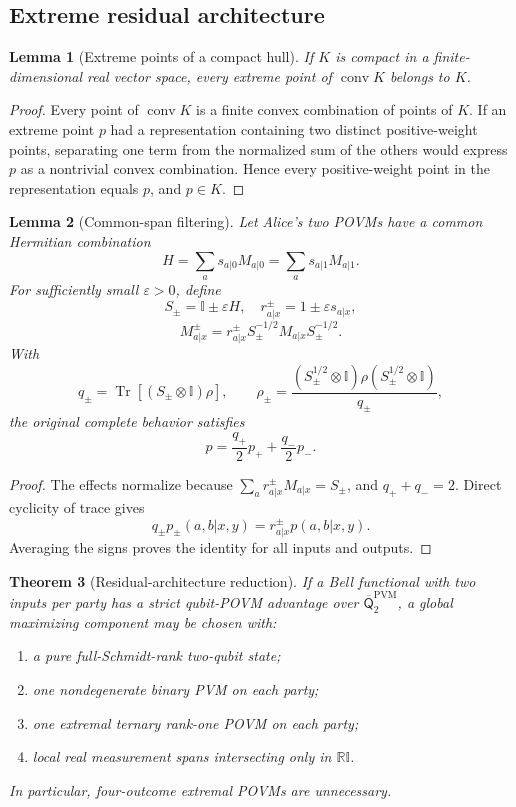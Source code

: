 \documentclass[11pt]{article}
\newtheorem{theorem}{Theorem}[section]
\newtheorem{lemma}[theorem]{Lemma}
\theoremstyle{definition}
\newcommand{\Tr}{\operatorname{Tr}}
\newcommand{\conv}{\operatorname{conv}}
\newcommand{\id}{\mathbb I}
\newcommand{\R}{\mathbb R}
\newcommand{\Qbar}{\overline{\mathsf Q}}
\newcommand{\PVM}{\mathrm{PVM}}
\newcommand{\eps}{\varepsilon}
\begin{document}
\subsection{Extreme residual architecture}

\begin{lemma}[Extreme points of a compact hull]
\label{lem:extreme-hull}
If \(K\) is compact in a finite-dimensional real vector space, every extreme
point of \(\conv K\) belongs to \(K\).
\end{lemma}

\begin{proof}
Every point of \(\conv K\) is a finite convex combination of points of \(K\).
If an extreme point \(p\) had a representation containing two distinct
positive-weight points, separating one term from the normalized sum of the
others would express \(p\) as a nontrivial convex combination. Hence every
positive-weight point in the representation equals \(p\), and \(p\in K\).
\end{proof}

\begin{lemma}[Common-span filtering]
\label{lem:common-span}
Let Alice's two POVMs have a common Hermitian combination
\[
H=\sum_a s_{a|0}M_{a|0}=\sum_a s_{a|1}M_{a|1}.
\]
For sufficiently small \(\eps>0\), define
\[
S_\pm=\id\pm\eps H,\quad
r^\pm_{a|x}=1\pm\eps s_{a|x},
\]
\[
M^\pm_{a|x}
=r^\pm_{a|x}S_\pm^{-1/2}M_{a|x}S_\pm^{-1/2}.
\]
With
\[
q_\pm=\Tr[(S_\pm\otimes\id)\rho],\qquad
\rho_\pm=
\frac{(S_\pm^{1/2}\otimes\id)\rho(S_\pm^{1/2}\otimes\id)}
{q_\pm},
\]
the original complete behavior satisfies
\[
p=\frac{q_+}{2}p_++\frac{q_-}{2}p_-.
\]
\end{lemma}

\begin{proof}
The effects normalize because
\(\sum_a r^\pm_{a|x}M_{a|x}=S_\pm\), and \(q_++q_-=2\).
Direct cyclicity of trace gives
\[
q_\pm p_\pm(a,b|x,y)=r^\pm_{a|x}p(a,b|x,y).
\]
Averaging the signs proves the identity for all inputs and outputs.
\end{proof}

\begin{theorem}[Residual-architecture reduction]
\label{thm:residual-reduction}
If a Bell functional with two inputs per party has a strict qubit-POVM advantage over
\(\Qbar^{\PVM}_2\), a global maximizing component may be chosen with:
\begin{enumerate}[label=(\roman*),itemsep=2pt]
\item a pure full-Schmidt-rank two-qubit state;
\item one nondegenerate binary PVM on each party;
\item one extremal ternary rank-one POVM on each party;
\item local real measurement spans intersecting only in \(\R\id\).
\end{enumerate}
In particular, four-outcome extremal POVMs are unnecessary.
\end{theorem}
\end{document}
